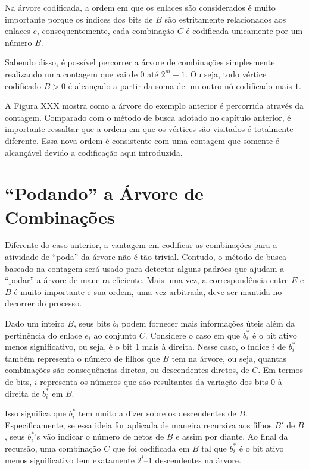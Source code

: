 Na árvore codificada, a ordem em que os enlaces são considerados é muito importante porque os índices dos bits de $B$ são estritamente relacionados aos enlaces $e$, consequentemente, cada combinação $C$ é codificada unicamente por um número $B$.

Sabendo disso, é possível percorrer a árvore de combinações simplesmente realizando uma contagem que vai de 0 até $2^m -1$. Ou seja, todo vértice codificado $B>0$ é alcançado a partir da soma de um outro nó codificado mais $1$.


A Figura XXX mostra como a árvore do exemplo anterior é percorrida através da contagem. Comparado com o método de busca adotado no capítulo anterior, é importante ressaltar que a ordem em que os vértices são visitados é totalmente diferente. Essa nova ordem é consistente com uma contagem que somente é alcançável devido a codificação aqui introduzida.

\section{“Podando” a Árvore de Combinações}

Diferente do caso anterior, a vantagem em codificar as combinações para a atividade de ``poda'' da árvore não é tão trivial. Contudo, o método de busca baseado na contagem será usado para detectar alguns padrões que ajudam a “podar” a árvore de maneira eficiente. Mais uma vez, a correspondência entre $E$ e $B$ é muito importante e sua ordem, uma vez arbitrada, deve ser mantida no decorrer do processo. 

Dado um inteiro $B$, seus bits $b_i$ podem fornecer mais informações úteis além da pertinência do enlace $e_i$ ao conjunto $C$. Considere o caso em que $b_i^*$ é o bit ativo menos significativo, ou seja, é o bit 1 mais à direita. Nesse caso, o índice $i$ de $b_i^*$ também representa o número de filhos que $B$ tem na árvore, ou seja, quantas combinações são consequências diretas, ou descendentes diretos, de $C$. Em termos de bits, $i$ representa os números que são resultantes da variação dos bits 0 à direita de $b_i^*$ em $B$.

Isso significa que $b_i^*$ tem muito a dizer sobre os descendentes de $B$. Especificamente, se essa ideia for aplicada de maneira recursiva aos filhos $B'$ de $B$, seus $b_i^*$’s vão indicar o número de netos de $B$ e assim por diante. Ao final da recursão, uma combinação $C$ que foi codificada em $B$ tal que $b_i^*$ é o bit ativo menos significativo tem exatamente $2^i–1$ descendentes na árvore.

